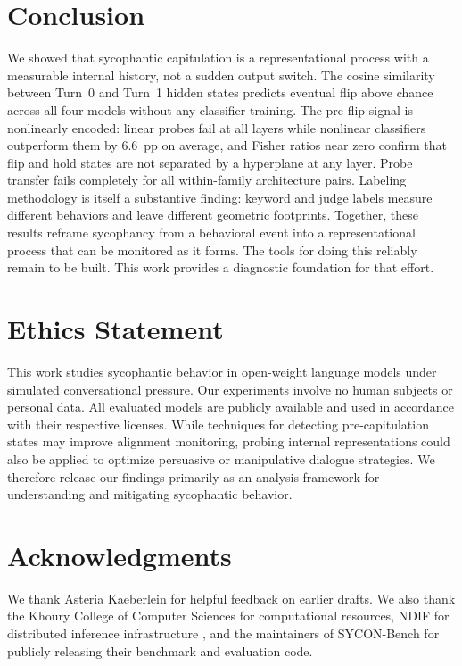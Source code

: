 \documentclass[11pt]{article}
\begin{document}
\section{Conclusion}
  \label{sec:conclusion}

  We showed that sycophantic capitulation is a representational process with a
  measurable internal history, not a sudden output switch. The cosine similarity
  between Turn~0 and Turn~1 hidden states predicts eventual flip above chance across
  all four models without any classifier training. The pre-flip signal is nonlinearly
  encoded: linear probes fail at all layers while nonlinear classifiers outperform
  them by 6.6~pp on average, and Fisher ratios near zero confirm that flip and hold
  states are not separated by a hyperplane at any layer. Probe transfer fails
  completely for all within-family architecture pairs. Labeling methodology is itself
  a substantive finding: keyword and judge labels measure different behaviors and
  leave different geometric footprints. Together, these results reframe sycophancy
  from a behavioral event into a representational process that can be monitored as it
  forms. The tools for doing this reliably remain to be built. This work provides a
  diagnostic foundation for that effort.

\section*{Ethics Statement}

This work studies sycophantic behavior in open-weight language models under
simulated conversational pressure. Our experiments involve no human subjects
or personal data. All evaluated models are publicly available and used in
accordance with their respective licenses. While techniques for detecting
pre-capitulation states may improve alignment monitoring, probing internal
representations could also be applied to optimize persuasive or manipulative
dialogue strategies. We therefore release our findings primarily as an
analysis framework for understanding and mitigating sycophantic behavior.

\section*{Acknowledgments}

We thank Asteria Kaeberlein for helpful feedback on earlier drafts. We also
thank the Khoury College of Computer Sciences for computational resources,
NDIF for distributed inference infrastructure \citep{fiottokaufman2025},
and the maintainers of SYCON-Bench for publicly releasing their benchmark
and evaluation code.
\end{document}

